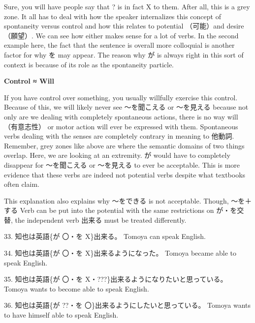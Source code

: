 \par{ Sure, you will have people say that ? is in fact X to them. After all, this is a grey zone. It all has to deal with how the speaker internalizes this concept of spontaneity versus control and how this relates to potential （可能）and desire （願望）. We can see how either makes sense for a lot of verbs. In the second example here, the fact that the sentence is overall more colloquial is another factor for why を may appear. The reason why が is always right in this sort of context is because of its role as the spontaneity particle. }

\par{ \textbf{Control ≈ Will } }

\par{ If you have control over something, you usually willfully exercise this control. Because of this, we will likely never see ～を聞こえる or ～を見える because not only are we dealing with completely spontaneous actions, there is no way will （有意志性） or motor action will ever be expressed with them. Spontaneous verbs dealing with the senses are completely contrary in meaning to 他動詞. Remember, grey zones like above are where the semantic domains of two things overlap. Here, we are looking at an extremity. が would have to completely disappear for ～を聞こえる or ～を見える to ever be acceptable. This is more evidence that these verbs are indeed not potential verbs despite what textbooks often claim. }

\par{ This explanation also explains why ～をできる is not acceptable. Though, ～を＋する Verb can be put into the potential with the same restrictions on が・を交替, the independent verb 出来る must be treated differently. }

\par{33. 知也は英語\{が 〇・を X\}出来る。 \hfill\break
Tomoya can speak English. }

\par{34. 知也は英語\{が 〇・を X\}出来るようになった。 \hfill\break
Tomoya became able to speak English. }

\par{35. 知也は英語\{が 〇・を X・???\}出来るようになりたいと思っている。 \hfill\break
Tomoya wants to become able to speak English. }

\par{36. 知也は英語\{が ??・を 〇\}出来るようにしたいと思っている。 \hfill\break
Tomoya wants to have himself able to speak English. }

